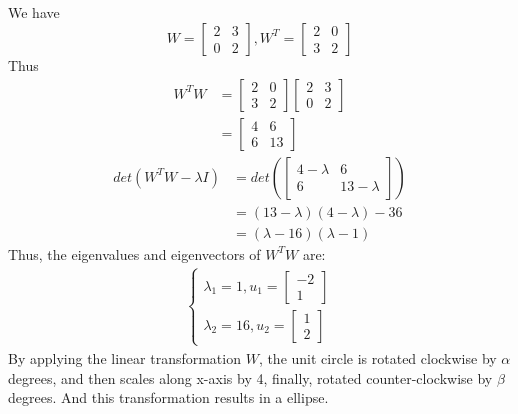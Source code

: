 \documentclass{article}
\begin{document}
\subsection{}\label{sub:} %
We have
\[
    W = \begin{bmatrix}
    2 & 3 \\
    0 & 2
    \end{bmatrix}, W^T = \begin{bmatrix}
    2 & 0 \\
    3 & 2
    \end{bmatrix}
\]
Thus
\begin{align*}
    W^TW &= \begin{bmatrix}
    2 & 0 \\
    3 & 2
    \end{bmatrix}
    \begin{bmatrix}
    2 & 3 \\
    0 & 2
    \end{bmatrix} \\ 
    &= \begin{bmatrix}
    4 & 6 \\
    6 & 13 
    \end{bmatrix}
\end{align*}
\begin{align*}
    det( W^TW - \lambda I ) &= det \left ( \begin{bmatrix}
    4-\lambda & 6 \\
    6 & 13- \lambda
    \end{bmatrix}\right )\\
    &= (13 - \lambda )(4 - \lambda ) - 36\\
    &= (\lambda - 16)(\lambda - 1)
\end{align*}
Thus, the eigenvalues and eigenvectors of $ W^TW $ are:
\begin{align*}
    \begin{cases}
        \lambda_1 = 1 , u_1 = \begin{bmatrix}
        -2 \\
        1 
        \end{bmatrix} \\
        \lambda_2 = 16, u_2 = \begin{bmatrix}
        1 \\
        2 
        \end{bmatrix}
    \end{cases}
\end{align*}
By applying the linear transformation $ W $, the unit circle is rotated clockwise by $ \alpha $ degrees, and then scales along x-axis by 4, finally, rotated counter-clockwise by $ \beta $ degrees. And this transformation results in a ellipse.
\end{document}
